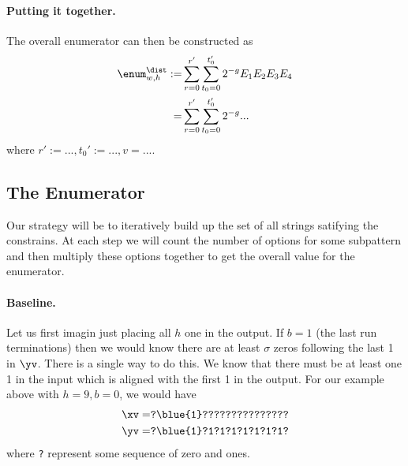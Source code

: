 \paragraph{Putting it together.}
The overall enumerator can then be constructed as
\begin{align*}
    \enum^\dist_{w,h} :=&\sum_{r=0}^{r'} \sum_{t_0=0}^{t_0'}2^{-g}E_1E_2E_3E_4\\
    =&\sum_{r=0}^{r'} \sum_{t_0=0}^{t_0'}2^{-g} ...
\end{align*}
where $r':=...,t_0':=..., v=...$.

\iffalse
\subsection{The Enumerator}

Our strategy will be to iteratively build up the set of all strings satifying the constrains. At each step we will count the number of options for some subpattern and then multiply these options together to get the overall value for the enumerator.

\paragraph{Baseline.} Let us first imagin just placing all $h$ one in the output. If $b=1$ (the last run terminations) then we would know there are at least $\sigma$ zeros following the last 1 in $\yv$. There is a single way to do this. We know that there must be at least one 1 in the input which is aligned with the first 1 in the output.  For our example above with $h=9,b=0$, we would have
\begin{align*}
    \xv=&\texttt{?\blue{1}???????????????}\\
    \yv=&\texttt{?\blue{1}?1?1?1?1?1?1?1?}
\end{align*}
where \texttt{?} represent some sequence of zero and ones. 
